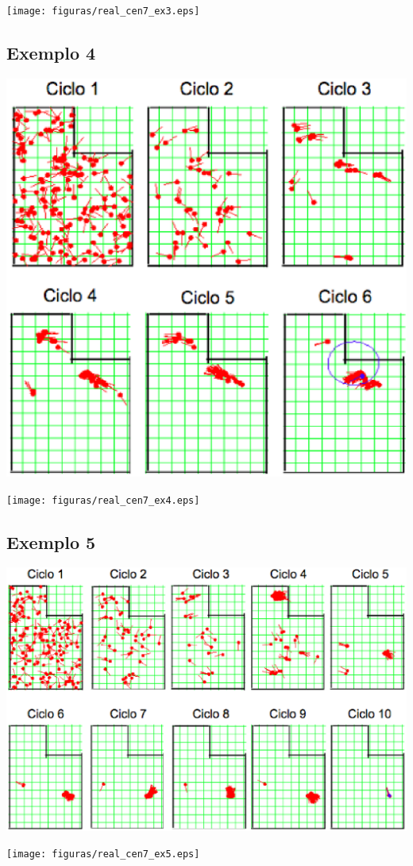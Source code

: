 {\centering
\texttt{[image: figuras/real\_cen7\_ex3.eps]}
\label{img:real_cen7_ex3}
\par}

\subsection{Exemplo 4}

{\centering
\includegraphics[scale=0.4]{figuras/cen7_ex4.eps}
\label{img:cen7_ex4}
\par}

{\centering
\texttt{[image: figuras/real\_cen7\_ex4.eps]}
\label{img:real_cen7_ex4}
\par}

\subsection{Exemplo 5}

{\centering
\includegraphics[scale=0.4]{figuras/cen7_ex5.eps}
\label{img:cen7_ex5}
\par}

{\centering
\texttt{[image: figuras/real\_cen7\_ex5.eps]}
\label{img:real_cen7_ex5}
\par}
